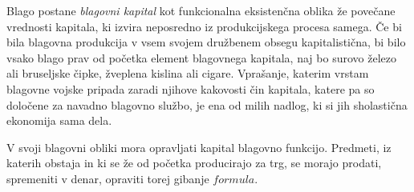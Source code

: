\documentclass[a5paper]{scrbook}
\begin{document}
Blago postane \emph{blagovni kapital} kot funkcionalna eksistenčna oblika že povečane vrednosti kapitala, ki izvira neposredno iz produkcijskega procesa samega. Če bi bila blagovna produkcija v vsem svojem družbenem obsegu kapitalistična, bi bilo vsako blago prav od početka element blagovnega kapitala, naj bo surovo železo ali bruseljske čipke, žveplena kislina ali cigare. Vprašanje, katerim vrstam blagovne vojske pripada zaradi njihove kakovosti čin kapitala, katere pa so določene za navadno blagovno službo, je ena od milih nadlog, ki si jih sholastična ekonomija sama dela.

V svoji blagovni obliki mora opravljati kapital blagovno funkcijo. Predmeti, iz katerih obstaja in ki se že od početka producirajo za trg, se morajo prodati, spremeniti v denar, opraviti torej gibanje \( formula \).
\end{document}
